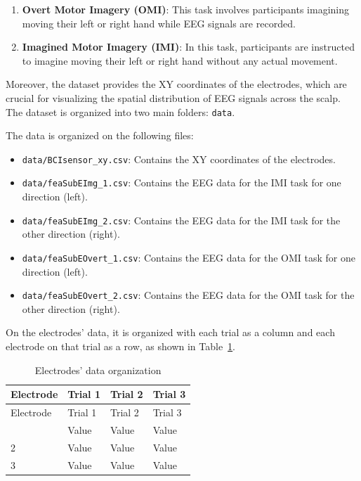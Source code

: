 \documentclass[
  letterpaper,
  DIV=11,
  numbers=noendperiod]{scrartcl}
\begin{document}
\begin{enumerate}
\def\labelenumi{\arabic{enumi}.}
\item
  \textbf{Overt Motor Imagery (OMI)}: This task involves participants
  imagining moving their left or right hand while EEG signals are
  recorded.
\item
  \textbf{Imagined Motor Imagery (IMI)}: In this task, participants are
  instructed to imagine moving their left or right hand without any
  actual movement.
\end{enumerate}

Moreover, the dataset provides the XY coordinates of the electrodes,
which are crucial for visualizing the spatial distribution of EEG
signals across the scalp. The dataset is organized into two main
folders: \texttt{data}.

The data is organized on the following files:

\begin{itemize}
\item
  \texttt{data/BCIsensor\_xy.csv}: Contains the XY coordinates of the
  electrodes.
\item
  \texttt{data/feaSubEImg\_1.csv}: Contains the EEG data for the IMI
  task for one direction (left).
\item
  \texttt{data/feaSubEImg\_2.csv}: Contains the EEG data for the IMI
  task for the other direction (right).
\item
  \texttt{data/feaSubEOvert\_1.csv}: Contains the EEG data for the OMI
  task for one direction (left).
\item
  \texttt{data/feaSubEOvert\_2.csv}: Contains the EEG data for the OMI
  task for the other direction (right).
\end{itemize}

On the electrodes' data, it is organized with each trial as a column and
each electrode on that trial as a row, as shown in
Table~\ref{tbl-electrodes}.

\begin{longtable}[]{@{}llll@{}}
\caption{Electrodes' data
organization}\label{tbl-electrodes}\tabularnewline
\toprule\noalign{}
Electrode & Trial 1 & Trial 2 & Trial 3 \\
\midrule\noalign{}
\endfirsthead
\toprule\noalign{}
Electrode & Trial 1 & Trial 2 & Trial 3 \\
\midrule\noalign{}
\endhead
\bottomrule\noalign{}
\endlastfoot
1 & Value & Value & Value \\
2 & Value & Value & Value \\
3 & Value & Value & Value \\
\end{longtable}
\end{document}
